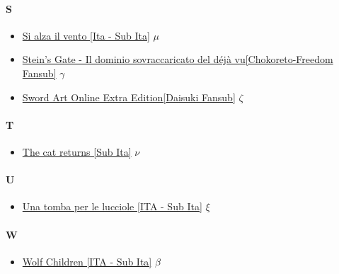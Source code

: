 		\paragraph{S} \hypertarget{FS}{}
			\begin{itemize}
				
				\item \href{https://mega.nz/#!FwoVCKpT!wXVhdgTQGj_YTibBZ4MJtpvsB4q_-rxskduTjisTrtU} {Si alza il vento [Ita - Sub Ita]} $\mu$   \\
				\item \href{https://mega.nz/#!l05ETJDZ!LKyrJbfOaKrRFDtpf3dW1saMCsw2cb8vSb-6qmSFrkg} {Stein's Gate -  Il dominio sovraccaricato del déjà vu[Chokoreto-Freedom Fansub]} $\gamma$   \\
				\item \href{https://mega.nz/#!Kol0gIpT!hjgrIyYC9pj_LIj3k9gmBmtK9kOpIKr9EExRs0284So} {Sword Art Online Extra Edition[Daisuki Fansub]} $\zeta$   \\
			
			\end{itemize}	
		
		\paragraph{T} \hypertarget{FT}{}
			\begin{itemize}
			
			\item \href{https://mega.nz/#!SgVzSJzL!dIggOkfhhN45NP0t5mjIns2ptlJEEPXgiuwAxPV2msY} {The cat returns [Sub Ita]} $\nu$   \\
			
			
			\end{itemize}
		
		\paragraph{U} \hypertarget{FU}{}
			\begin{itemize}
				
				\item \href{https://mega.nz/#!GgxmyRzZ!V37zGQBKqtFVHaH7U2Xa8KFieHt5M8VsDs7jAMPu6ZM} {Una tomba per le lucciole [ITA - Sub Ita]} $\xi$   \\
			
			\end{itemize}
		 
		 \paragraph{W} \hypertarget{FW}{}
			\begin{itemize}
				
				\item \href{https://mega.nz/#!7wJGnagT!R50hS8GO08F1WomihtT0R2lToH-DMs9ndMitKEG0Qz4} {Wolf Children [ITA - Sub Ita]} $\beta$   \\
			
			\end{itemize}
			
			
